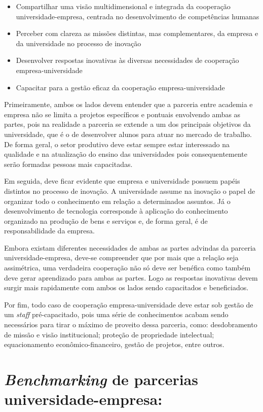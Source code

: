 \begin{itemize}
\item Compartilhar uma visão multidimensional e integrada da cooperação universidade-empresa, centrada no desenvolvimento de competências humanas
\item Perceber com clareza as missões distintas, mas complementares, da empresa e da universidade no processo de inovação
\item Desenvolver respostas inovativas às diversas necessidades de cooperação empresa-universidade
\item Capacitar para a gestão eficaz da cooperação empresa-universidade
\end{itemize}

Primeiramente, ambos os lados devem entender que a parceria entre academia e empresa não se limita a projetos específicos e pontuais envolvendo ambas as partes, pois na realidade a parceria se extende a um dos principais objetivos da universidade, que é o de desenvolver alunos para atuar no mercado de trabalho. De forma geral, o setor produtivo deve estar sempre estar interessado na qualidade e na atualização do ensino das universidades pois consequentemente serão formadas pessoas mais capacitadas.

Em seguida, deve ficar evidente que empresa e universidade possuem papéis distintos no processo de inovação. A universidade assume na inovação o papel de organizar todo o conhecimento em relação a determinados assuntos. Já o desenvolvimento de tecnologia corresponde à aplicação do conhecimento organizado na produção de bens e serviços e, de forma geral, é de responsabilidade da empresa.

Embora existam diferentes necessidades de ambas as partes advindas da parceria universidade-empresa, deve-se compreender que por mais que a relação seja assimétrica, uma verdadeira cooperação não só deve ser benéfica como também deve gerar aprendizado para ambas as partes. Logo as respostas inovativas devem surgir mais rapidamente com ambos os lados sendo capacitados e beneficiados.

Por fim, todo caso de cooperação empresa-universidade deve estar sob gestão de um \textit{staff} pré-capacitado, pois uma série de conhecimentos acabam sendo necessários para tirar o máximo de proveito dessa parceria, como: desdobramento de missão e visão institucional; proteção de propriedade intelectual; equacionamento econômico-financeiro, gestão de projetos, entre outros.

\section{\textit{Benchmarking} de parcerias universidade-empresa:} %
\label{sec:cases}

